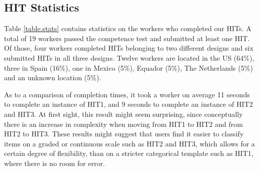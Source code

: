 \documentclass[11pt,letterpaper]{article}
\begin{document}
\subsection{HIT Statistics}

Table \ref{table.stats} contains statistics on the workers who completed our HITs. A total of 19 workers passed the competence test and submitted at least one HIT. Of those, four workers completed HITs belonging to two different designs and six submitted HITs in all three designs. Twelve workers are located in the US (64\%), three in Spain (16\%), one in Mexico (5\%), Equador (5\%), The Netherlands (5\%) and an unknown location (5\%).

As to a comparison of completion times, it took a worker on average 11 seconds to complete an instance of HIT1, and 9 seconds to complete an instance of HIT2 and HIT3. At first sight, this result might seem surprising, since conceptually there is an increase in complexity when moving from HIT1 to HIT2 and from HIT2 to HIT3. These results might suggest that users find it easier to classify items on a graded or continuous scale such as HIT2 and HIT3, which allows for a certain degree of flexibility, than on a stricter categorical template such as HIT1, where there is no room for error.
\end{document}
